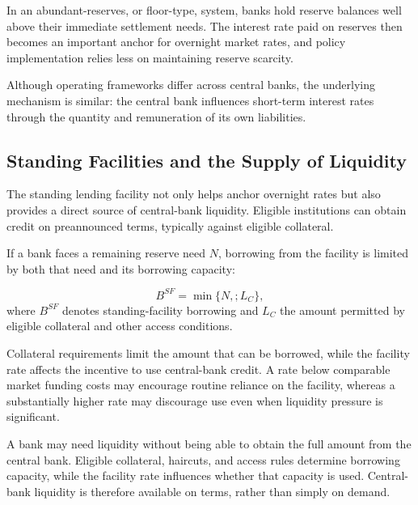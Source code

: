 In an abundant-reserves, or floor-type, system, banks hold reserve balances well above their immediate settlement needs. The interest rate paid on reserves then becomes an important anchor for overnight market rates, and policy implementation relies less on maintaining reserve scarcity.

Although operating frameworks differ across central banks, the underlying mechanism is similar: the central bank influences short-term interest rates through the quantity and remuneration of its own liabilities.


\subsection{Standing Facilities and the Supply of Liquidity}

The standing lending facility not only helps anchor overnight rates but also provides a direct source of central-bank liquidity. Eligible institutions can obtain credit on preannounced terms, typically against eligible collateral.

If a bank faces a remaining reserve need \(N\), borrowing from the facility is limited by both that need and its borrowing capacity:

\begin{equation}
B^{SF}
=\min\{N,;L_C\},
\label{eq:ch22-standing-facility}
\end{equation}
where \(B^{SF}\) denotes standing-facility borrowing and \(L_C\) the amount permitted by eligible collateral and other access conditions.

Collateral requirements limit the amount that can be borrowed, while the facility rate affects the incentive to use central-bank credit. A rate below comparable market funding costs may encourage routine reliance on the facility, whereas a substantially higher rate may discourage use even when liquidity pressure is significant.

\begin{tcolorbox}[
enhanced,
breakable,
colback=white,
colframe=FinanceBlue,
boxrule=0.7pt,
sharp corners,
borderline west={2.2pt}{0pt}{FinanceBlue},
title=\textbf{Financial Perspective: Liquidity Access Depends on Borrowing Capacity},
coltitle=white,
colbacktitle=FinanceBlue,
fonttitle=\bfseries,
before skip=1.2em,
after skip=1.2em
]

A bank may need liquidity without being able to obtain the full amount from the central bank. Eligible collateral, haircuts, and access rules determine borrowing capacity, while the facility rate influences whether that capacity is used. Central-bank liquidity is therefore available on terms, rather than simply on demand.

\end{tcolorbox}


